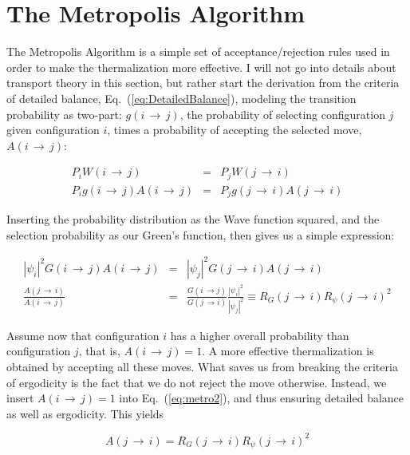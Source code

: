 \section{The Metropolis Algorithm}
\label{sec:MetroMain}

The Metropolis Algorithm is a simple set of acceptance/rejection rules used in order to make the thermalization more effective. I will not go into details about transport theory in this section, but rather start the derivation from the criteria of detailed balance, Eq.~(\ref{eq:DetailedBalance}), modeling the transition probability as two-part: $g(i\,\rightarrow\,j)$, the probability of selecting configuration $j$ given configuration $i$, times a probability of accepting the selected move, $A(i\,\rightarrow\,j)$:

\begin{eqnarray}
 \label{eq:metro1}
 P_iW(i\,\rightarrow\,j) &=& P_jW(j\,\rightarrow\,i) \nonumber \\
 P_ig(i\,\rightarrow\,j)A(i\,\rightarrow\,j) &=& P_jg(j\,\rightarrow\,i)A(j\,\rightarrow\,i)
\end{eqnarray}

Inserting the probability distribution as the Wave function squared, and the selection probability as our Green's function, then gives us a simple expression:

\begin{eqnarray}
  \label{eq:metro2}
  |\psi_i|^2G(i\,\rightarrow\,j)A(i\,\rightarrow\,j) &=& |\psi_j|^2G(j\,\rightarrow\,i)A(j\,\rightarrow\,i) \nonumber \\
  \frac{A(j\,\rightarrow\,i)}{A(i\,\rightarrow\,j)} &=& \frac{G(i\,\rightarrow j)}{G(j\,\rightarrow i)}\frac{|\psi_i|^2}{|\psi_j|^2} \equiv R_G(j\,\rightarrow\,i)R_\psi(j\,\rightarrow\,i)^2
\end{eqnarray}

Assume now that configuration $i$ has a higher overall probability than configuration $j$, that is, $A(i\,\rightarrow\,j) = 1$. A more effective thermalization is obtained by accepting all these moves. What saves us from breaking the criteria of ergodicity is the fact that we do not reject the move otherwise. Instead, we insert $A(i\,\rightarrow\,j) = 1$ into Eq.~(\ref{eq:metro2}), and thus ensuring detailed balance as well as ergodicity. This yields

\begin{equation*}
 A(j\,\rightarrow\,i) = R_G(j\,\rightarrow\,i)R_\psi(j\,\rightarrow\,i)^2
\end{equation*}


